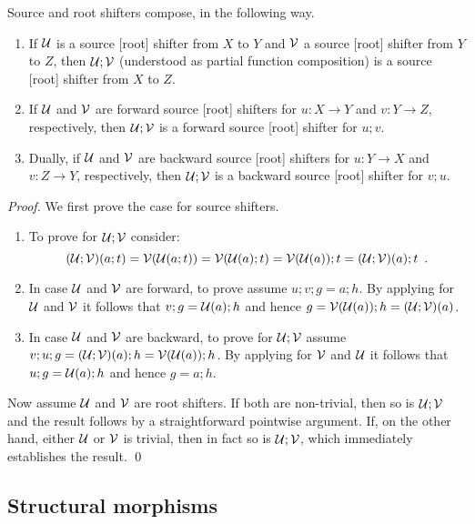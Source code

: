 %
Source and root shifters compose, in the following way.
%
\begin{proposition}
\begin{enumerate}[topsep=\smallskipamount]
\item If $\mathcal{U}$ is a source [root] shifter from $X$ to $Y$ and $\mathcal{V}$ a source [root] shifter from $Y$ to $Z$, then $\mathcal{U};\mathcal{V}$ (understood as partial function composition) is a source [root] shifter from $X$ to $Z$. 
\item If $\mathcal{U}$ and $\mathcal{V}$ are forward source [root] shifters for $u: X\to Y$ and $v: Y \to Z$, respectively, then $\mathcal{U};\mathcal{V}$ is a forward source [root] shifter for $u;v$.
\item Dually, if $\mathcal{U}$ and $\mathcal{V}$ are backward source [root] shifters for $u: Y\to X$ and $v: Z \to Y$, respectively, then $\mathcal{U};\mathcal{V}$ is a backward source [root] shifter for $v;u$.
\end{enumerate}
\end{proposition}

\begin{proof}
We first prove the case for source shifters.
\begin{enumerate}
\item To prove  for $\mathcal{U};\mathcal{V}$ consider:
\[ (\mathcal{U};\mathcal{V})(a;t) = \mathcal{V}(\mathcal{U}(a;t))= \mathcal{V}(\mathcal{U}(a);t)=\mathcal{V}(\mathcal{U}(a));t=(\mathcal{U};\mathcal{V})(a);t \enspace. \]

\item In case $\mathcal{U}$ and $\mathcal{V}$ are forward, to prove  assume $u;v;g=a;h$. By applying  for $\mathcal{U}$ and $\mathcal{V}$ it follows that $v;g=\mathcal{U}(a);h$ and hence $g=\mathcal{V}(\mathcal{U}(a));h=(\mathcal{U};\mathcal{V})(a)$.

\item In case $\mathcal{U}$ and $\mathcal{V}$ are backward, to prove  for $\mathcal{U};\mathcal{V}$ assume $v;u;g=(\mathcal{U};\mathcal{V})(a);h=\mathcal{V}(\mathcal{U}(a));h$. By applying  for $\mathcal{V}$ and $\mathcal{U}$ it follows that $u;g=\mathcal{U}(a);h$ and hence $g=a;h$.
\end{enumerate}
%
Now assume $\mathcal{U}$ and $\mathcal{V}$ are root shifters. If both are non-trivial, then so is $\mathcal{U};\mathcal{V}$ and the result follows by a straightforward pointwise argument. If, on the other hand, either $\mathcal{U}$ or $\mathcal{V}$ is trivial, then in fact so is $\mathcal{U};\mathcal{V}$, which immediately establishes the result.
\qed
\end{proof}

\subsection{Structural morphisms}

